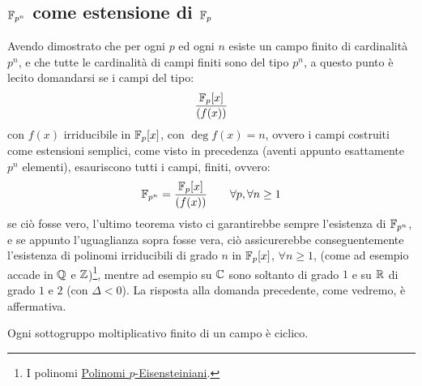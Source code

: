 \documentclass[11pt]{scrartcl}
\begin{document}
\subsection{$\mathbb{F}_{p^{n}}$ come estensione di ${\mathbb F}_p$}
Avendo dimostrato che per ogni $p$ ed ogni $n$ esiste un campo finito di cardinalità $p^n$, e che tutte le cardinalità di campi finiti sono del tipo $p^n$, a questo punto è 
lecito domandarsi se i campi del tipo:
	\[ \frac{{\mathbb F}_p[x]}{(f(x))}
		\]
con $f(x)$ irriducibile in ${\mathbb F}_p[x]$, con $\deg f(x) = n$, ovvero i campi costruiti come estensioni semplici, come visto in precedenza (aventi appunto esattamente $p^n$ elementi), esauriscono tutti i campi,
finiti, ovvero:
	\[ \mathbb{F}_{p^{n}} = \frac{{\mathbb F}_p[x]}{(f(x))} \qquad \forall p,\forall n \geq 1
	\]
se ciò fosse vero, l'ultimo teorema visto ci garantirebbe sempre l'esistenza di $\mathbb{F}_{p^{n}}$, e se appunto l'uguaglianza sopra fosse vera, ciò assicurerebbe conseguentemente l'esistenza di
 polinomi irriducibili di grado $n$ in ${\mathbb F}_p[x]$, $\forall n \geq 1$, (come ad esempio accade in $\mathbb Q$ e $\mathbb Z$)\footnote{I polinomi \hyperref[p:pE]{Polinomi $p$-Eisensteiniani}.},
  mentre ad esempio su $\mathbb C$ sono soltanto di grado $1$ e su $\mathbb R$  di grado $1$ e $2$  (con $\Delta<0$).
La risposta alla domanda precedente, come vedremo, è affermativa.


\begin{theorem}
	\label{cf:5.11}
	Ogni sottogruppo moltiplicativo finito di un campo è ciclico.
\end{theorem}
\end{document}
